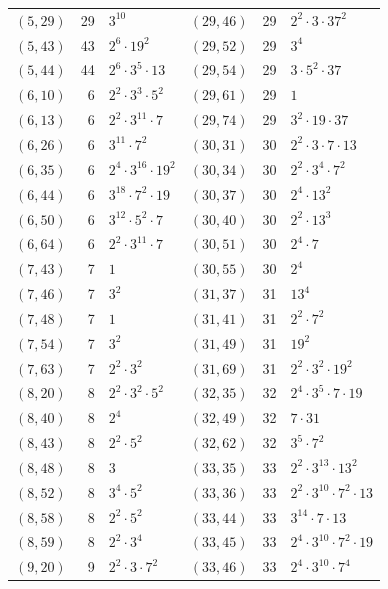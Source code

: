 \documentclass[11pt]{article}
\begin{document}
\begin{longtable}{@{}lrl@{\qquad}lrl@{}}
$(5,29)$ & 29 & $3^{10}$ & $(29,46)$ & 29 & $2^{2}\cdot 3\cdot 37^{2}$\\
$(5,43)$ & 43 & $2^{6}\cdot 19^{2}$ & $(29,52)$ & 29 & $3^{4}$\\
$(5,44)$ & 44 & $2^{6}\cdot 3^{5}\cdot 13$ & $(29,54)$ & 29 & $3\cdot 5^{2}\cdot 37$\\
$(6,10)$ & 6 & $2^{2}\cdot 3^{3}\cdot 5^{2}$ & $(29,61)$ & 29 & $1$\\
$(6,13)$ & 6 & $2^{2}\cdot 3^{11}\cdot 7$ & $(29,74)$ & 29 & $3^{2}\cdot 19\cdot 37$\\
$(6,26)$ & 6 & $3^{11}\cdot 7^{2}$ & $(30,31)$ & 30 & $2^{2}\cdot 3\cdot 7\cdot 13$\\
$(6,35)$ & 6 & $2^{4}\cdot 3^{16}\cdot 19^{2}$ & $(30,34)$ & 30 & $2^{2}\cdot 3^{4}\cdot 7^{2}$\\
$(6,44)$ & 6 & $3^{18}\cdot 7^{2}\cdot 19$ & $(30,37)$ & 30 & $2^{4}\cdot 13^{2}$\\
$(6,50)$ & 6 & $3^{12}\cdot 5^{2}\cdot 7$ & $(30,40)$ & 30 & $2^{2}\cdot 13^{3}$\\
$(6,64)$ & 6 & $2^{2}\cdot 3^{11}\cdot 7$ & $(30,51)$ & 30 & $2^{4}\cdot 7$\\
$(7,43)$ & 7 & $1$ & $(30,55)$ & 30 & $2^{4}$\\
$(7,46)$ & 7 & $3^{2}$ & $(31,37)$ & 31 & $13^{4}$\\
$(7,48)$ & 7 & $1$ & $(31,41)$ & 31 & $2^{2}\cdot 7^{2}$\\
$(7,54)$ & 7 & $3^{2}$ & $(31,49)$ & 31 & $19^{2}$\\
$(7,63)$ & 7 & $2^{2}\cdot 3^{2}$ & $(31,69)$ & 31 & $2^{2}\cdot 3^{2}\cdot 19^{2}$\\
$(8,20)$ & 8 & $2^{2}\cdot 3^{2}\cdot 5^{2}$ & $(32,35)$ & 32 & $2^{4}\cdot 3^{5}\cdot 7\cdot 19$\\
$(8,40)$ & 8 & $2^{4}$ & $(32,49)$ & 32 & $7\cdot 31$\\
$(8,43)$ & 8 & $2^{2}\cdot 5^{2}$ & $(32,62)$ & 32 & $3^{5}\cdot 7^{2}$\\
$(8,48)$ & 8 & $3$ & $(33,35)$ & 33 & $2^{2}\cdot 3^{13}\cdot 13^{2}$\\
$(8,52)$ & 8 & $3^{4}\cdot 5^{2}$ & $(33,36)$ & 33 & $2^{2}\cdot 3^{10}\cdot 7^{2}\cdot 13$\\
$(8,58)$ & 8 & $2^{2}\cdot 5^{2}$ & $(33,44)$ & 33 & $3^{14}\cdot 7\cdot 13$\\
$(8,59)$ & 8 & $2^{2}\cdot 3^{4}$ & $(33,45)$ & 33 & $2^{4}\cdot 3^{10}\cdot 7^{2}\cdot 19$\\
$(9,20)$ & 9 & $2^{2}\cdot 3\cdot 7^{2}$ & $(33,46)$ & 33 & $2^{4}\cdot 3^{10}\cdot 7^{4}$\\

\end{longtable}
\end{document}
